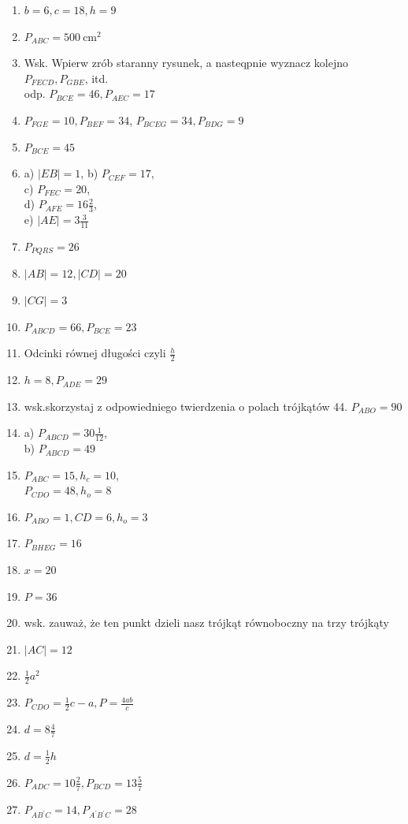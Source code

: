 \documentclass[10pt]{article}
\begin{document}
\begin{enumerate}
  \item \(b=6, c=18, h=9\)
  \item \(P_{A B C}=500 \mathrm{~cm}^{2}\)
  \item Wsk. Wpierw zrób staranny rysunek, a nasteqpnie wyznacz kolejno\\
\(P_{F E C D}, P_{G B E}\), itd.\\
odp. \(P_{B C E}=46, P_{A E C}=17\)
  \item \(P_{F G E}=10, P_{B E F}=34\), \(P_{B C E G}=34, P_{B D G}=9\)
  \item \(P_{B C E}=45\)
  \item a) \(|E B|=1\), b) \(P_{C E F}=17\),\\
c) \(P_{F E C}=20\),\\
d) \(P_{A F E}=16 \frac{2}{3}\),\\
e) \(|A E|=3 \frac{3}{11}\)
  \item \(P_{P Q R S}=26\)
  \item \(|A B|=12,|C D|=20\)
  \item \(|C G|=3\)
  \item \(P_{A B C D}=66, P_{B C E}=23\)
  \item Odcinki równej długości czyli \(\frac{h}{2}\)
  \item \(h=8, P_{A D E}=29\)
  \item wsk.skorzystaj z odpowiedniego twierdzenia o polach trójkątów 44. \(P_{A B O}=90\)
  \item a) \(P_{A B C D}=30 \frac{1}{12}\),\\
b) \(P_{A B C D}=49\)
  \item \(P_{A B C}=15, h_{c}=10\),\\
\(P_{C D O}=48, h_{o}=8\)
  \item \(P_{A B O}=1, C D=6, h_{o}=3\)
  \item \(P_{B H E G}=16\)
  \item \(x=20\)
  \item \(P=36\)
  \item wsk. zauważ, że ten punkt dzieli nasz trójkąt równoboczny na trzy trójkąty
  \item \(|A C|=12\)
  \item \(\frac{1}{2} a^{2}\)
  \item \(P_{C D O}=\frac{1}{2} c-a, P=\frac{4 a b}{c}\)
  \item \(d=8 \frac{4}{7}\)
  \item \(d=\frac{1}{2} h\)
  \item \(P_{A D C}=10 \frac{2}{7}, P_{B C D}=13 \frac{5}{7}\)
  \item \(P_{A B^{\prime} C}=14, P_{A^{\prime} B^{\prime} C}=28\)
\end{enumerate}
\end{document}
